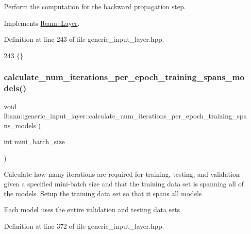 Perform the computation for the backward propagation step. 

Implements \hyperlink{classlbann_1_1Layer_a7442e01f9ee1294df2de811efcf5171e}{lbann\+::\+Layer}.



Definition at line 243 of file generic\+\_\+input\+\_\+layer.\+hpp.


\begin{DoxyCode}
243 \{\}
\end{DoxyCode}
\mbox{\label{classlbann_1_1generic__input__layer_af108a5dc05276bc6bc57b306204b12e4}} 
\subsubsection{\texorpdfstring{calculate\+\_\+num\+\_\+iterations\+\_\+per\+\_\+epoch\+\_\+training\+\_\+spans\+\_\+models()}{calculate\_num\_iterations\_per\_epoch\_training\_spans\_models()}}
{\footnotesize\ttfamily void lbann\+::generic\+\_\+input\+\_\+layer\+::calculate\+\_\+num\+\_\+iterations\+\_\+per\+\_\+epoch\+\_\+training\+\_\+spans\+\_\+models (\begin{DoxyParamCaption}\item[{int}]{mini\+\_\+batch\+\_\+size }\end{DoxyParamCaption})\hspace{0.3cm}{\ttfamily [inline]}}

Calculate how many iterations are required for training, testing, and validation given a specified mini-\/batch size and that the training data set is spanning all of the models. Setup the training data set so that it spans all models

Each model uses the entire validation and testing data sets 

Definition at line 372 of file generic\+\_\+input\+\_\+layer.\+hpp.


